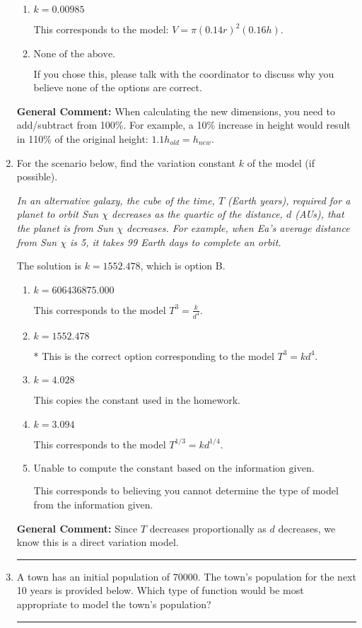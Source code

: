 \documentclass{extbook}[14pt]
\newcommand{\litem}[1]{\item #1

\rule{\textwidth}{0.4pt}}
\begin{document}
\begin{enumerate}
{\begin{enumerate}[label=\Alph*.]
This corresponds to the model: $V = (0.14 r)^2 (0.16 h)$.
\item \( k = 0.00985 \)

This corresponds to the model: $V = \pi (0.14 r)^2 (0.16 h)$.
\item \( \text{None of the above.} \)

If you chose this, please talk with the coordinator to discuss why you believe none of the options are correct.
\end{enumerate}

\textbf{General Comment:} When calculating the new dimensions, you need to add/subtract from 100\%. For example, a 10\% increase in height would result in 110\% of the original height: $1.1h_{old} = h_{new}$.
}
\litem{
For the scenario below, find the variation constant $k$ of the model (if possible).

\begin{center}
    \textit{ In an alternative galaxy, the cube of the time, $T$ (Earth years), required for a planet to orbit Sun $\chi$ decreases as the quartic of the distance, $d$ (AUs), that the planet is from Sun $\chi$ decreases. For example, when Ea's average distance from Sun $\chi$ is 5, it takes 99 Earth days to complete an orbit. }
\end{center}


The solution is \( k = 1552.478 \), which is option B.\begin{enumerate}[label=\Alph*.]
\item \( k = 606436875.000 \)

This corresponds to the model $T^{3} = \frac{k}{d^{4}}$.
\item \( k = 1552.478 \)

* This is the correct option corresponding to the model $T^{3} = k d^{4}$.
\item \( k = 4.028 \)

This copies the constant used in the homework.
\item \( k = 3.094 \)

This corresponds to the model $T^{1/3} = k d^{1/4}$.
\item \( \text{Unable to compute the constant based on the information given.} \)

This corresponds to believing you cannot determine the type of model from the information given.
\end{enumerate}

\textbf{General Comment:} Since $T$ decreases proportionally as $d$ decreases, we know this is a direct variation model.
}
\litem{
A town has an initial population of 70000. The town's population for the next 10 years is provided below. Which type of function would be most appropriate to model the town's population?



}
\end{enumerate}
\end{document}
